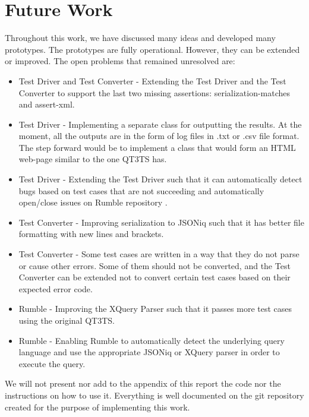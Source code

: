 \section{Future Work}
Throughout this work, we have discussed many ideas and developed many prototypes. The prototypes are fully operational. However, they can be extended or improved. The open problems that remained unresolved are:
\begin{itemize}
	\item Test Driver and Test Converter - Extending the Test Driver and the Test Converter to support the last two missing assertions: serialization-matches and assert-xml.
	\item Test Driver - Implementing a separate class for outputting the results. At the moment, all the outputs are in the form of log files in .txt or .csv file format. The step forward would be to implement a class that would form an HTML web-page similar to the one QT3TS has.
	\item Test Driver - Extending the Test Driver such that it can automatically detect bugs based on test cases that are not succeeding and automatically open/close issues on Rumble repository \cite{RumbleRepository}.
	\item Test Converter - Improving serialization to JSONiq such that it has better file formatting with new lines and brackets.
	\item Test Converter - Some test cases are written in a way that they do not parse or cause other errors. Some of them should not be converted, and the Test Converter can be extended not to convert certain test cases based on their expected error code.
	\item Rumble - Improving the XQuery Parser such that it passes more test cases using the original QT3TS.
	\item Rumble - Enabling Rumble to automatically detect the underlying query language and use the appropriate JSONiq or XQuery parser in order to execute the query. 
\end{itemize}

We will not present nor add to the appendix of this report the code nor the instructions on how to use it. Everything is well documented on the git repository \cite{StevanRepo} created for the purpose of implementing this work. 